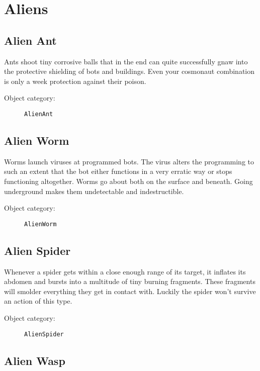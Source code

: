 \section{Aliens}

\subsection{Alien Ant}

Ants shoot tiny corrosive balls that in the end can quite successfully gnaw into the protective shielding of bots and buildings. Even your cosmonaut combination is only a week protection against their poison.

\begin{description}
    \item[Object category:] \texttt{AlienAnt}
\end{description}


\subsection{Alien Worm}

Worms launch viruses at programmed bots.
The virus alters the programming to such an extent that the bot either functions in a very erratic way or stops functioning altogether.
Worms go about both on the surface and beneath. Going underground makes them undetectable and indestructible.
 
\begin{description}
    \item[Object category:] \texttt{AlienWorm}
\end{description}

\subsection{Alien Spider}

Whenever a spider gets within a close enough range of its target, it inflates its abdomen and bursts into a multitude of tiny burning fragments. These fragments will smolder everything they get in contact with. Luckily the spider won't survive an action of this type.

\begin{description}
    \item[Object category:] \texttt{AlienSpider}
\end{description}


\subsection{Alien Wasp}

